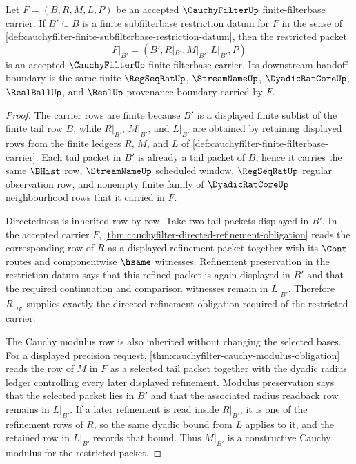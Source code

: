 \begin{theorem}
\label{thm:cauchyfilter-finite-subfilterbase-restriction}
Let $F=(B,R,M,L,P)$ be an accepted $\CauchyFilterUp$ finite-filterbase carrier.
If $B'\subseteq B$ is a finite subfilterbase restriction datum for $F$ in the
sense of \autoref{def:cauchyfilter-finite-subfilterbase-restriction-datum},
then the restricted packet
$$
F|_{B'}=(B',R|_{B'},M|_{B'},L|_{B'},P)
$$
is an accepted $\CauchyFilterUp$ finite-filterbase carrier. Its downstream
handoff boundary is the same finite $\RegSeqRatUp$, $\StreamNameUp$,
$\DyadicRatCoreUp$, $\RealBallUp$, and $\RealUp$ provenance boundary carried by
$F$.
\end{theorem}
\begin{proof}
The carrier rows are finite because $B'$ is a displayed finite sublist of the
finite tail row $B$, while $R|_{B'}$, $M|_{B'}$, and $L|_{B'}$ are obtained by
retaining displayed rows from the finite ledgers $R$, $M$, and $L$ of
\autoref{def:cauchyfilter-finite-filterbase-carrier}. Each tail packet in
$B'$ is already a tail packet of $B$, hence it carries the same $\BHist$ row,
$\StreamNameUp$ scheduled window, $\RegSeqRatUp$ regular observation row, and
nonempty finite family of $\DyadicRatCoreUp$ neighbourhood rows that it carried
in $F$.

Directedness is inherited row by row. Take two tail packets displayed in
$B'$. In the accepted carrier $F$, \autoref{thm:cauchyfilter-directed-refinement-obligation}
reads the corresponding row of $R$ as a displayed refinement packet together
with its $\Cont$ routes and componentwise $\hsame$ witnesses. Refinement
preservation in the restriction datum says that this refined packet is again
displayed in $B'$ and that the required continuation and comparison witnesses
remain in $L|_{B'}$. Therefore $R|_{B'}$ supplies exactly the directed
refinement obligation required of the restricted carrier.

The Cauchy modulus row is also inherited without changing the selected bases.
For a displayed precision request, \autoref{thm:cauchyfilter-cauchy-modulus-obligation}
reads the row of $M$ in $F$ as a selected tail packet together with the dyadic
radius ledger controlling every later displayed refinement. Modulus
preservation says that the selected packet lies in $B'$ and that the associated
radius readback row remains in $L|_{B'}$. If a later refinement is read inside
$R|_{B'}$, it is one of the refinement rows of $R$, so the same dyadic bound
from $L$ applies to it, and the retained row in $L|_{B'}$ records that bound.
Thus $M|_{B'}$ is a constructive Cauchy modulus for the restricted packet.


\end{proof}
